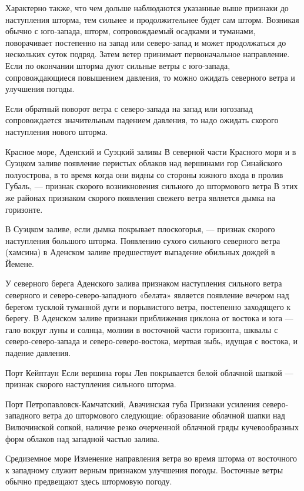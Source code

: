 Характерно также, что чем дольше наблюдаются указанные выше признаки до наступления шторма, тем сильнее и продолжительнее будет сам шторм. Возникая обычно с юго-запада, шторм, сопровождаемый осадками и туманами, поворачивает постепенно на запад или северо-запад и может продолжаться до нескольких суток подряд. Затем ветер принимает первоначальное направление. Если по окончании шторма дуют сильные ветры с юго-запада, сопровождающиеся повышением давления, то можно ожидать северного ветра и улучшения погоды.

Если обратный поворот ветра с северо-запада на запад или югозапад сопровождается значительным падением давления, то надо ожидать скорого наступления нового шторма.

Красное море, Аденский и Суэцкий заливы
В северной части Красного моря и в Суэцком заливе появление перистых облаков над вершинами гор Синайского полуострова, в то время когда они видны со стороны южного входа в пролив Губаль, — признак скорого возникновения сильного до штормового ветра В этих же районах признаком скорого появления свежего ветра является дымка на горизонте.

В Суэцком заливе, если дымка покрывает плоскогорья, — признак скорого наступления большого шторма. Появлению сухого сильного северного ветра (хамсина) в Аденском заливе предшествует выпадение обильных дождей в Йемене.

У северного берега Аденского залива признаком наступления сильного ветра северного и северо-северо-западного «белата» является появление вечером над берегом тусклой туманной дуги и порывистого ветра, постепенно заходящего к берегу. В Аденском заливе признаки приближения циклона от востока и юга — гало вокруг луны и солнца, молнии в восточной части горизонта, шквалы с северо-северо-запада и северо-северо-востока, мертвая зыбь, идущая с востока, и падение давления.

Порт Кейптаун
Если вершина горы Лев покрывается белой облачной шапкой — признак скорого наступления сильного шторма.

Порт Петропавловск-Камчатский, Авачинская губа
Признаки усиления северо-западного ветра до штормового следующие: образование облачной шапки над Вилючинской сопкой, наличие резко очерченной облачной гряды кучевообразных форм облаков над западной частью залива.

Средиземное море
Изменение направления ветра во время шторма от восточного к западному служит верным признаком улучшения погоды. Восточные ветры обычно предвещают здесь штормовую погоду.

